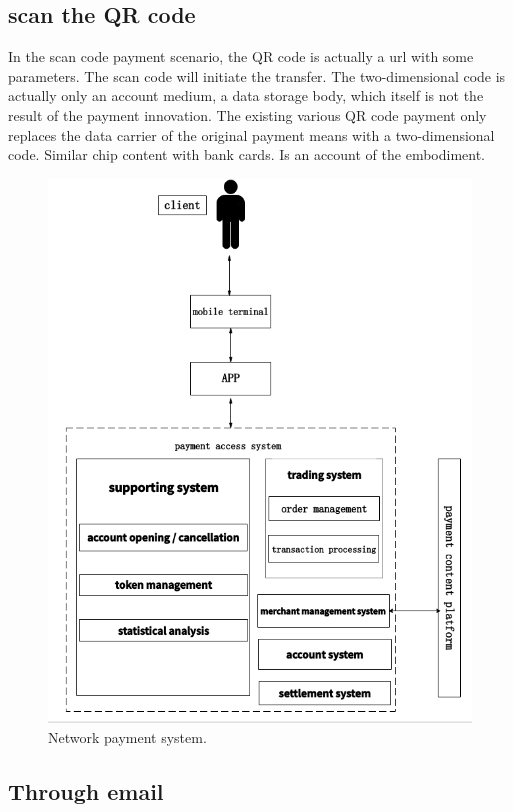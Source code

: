 \documentclass[journal]{IEEEtran}
\begin{document}
\subsection{scan the QR code}
In the scan code payment scenario, the QR code is actually a url with some parameters. The scan code will initiate the transfer. The two-dimensional code is actually only an account medium, a data storage body, which itself is not the result of the payment innovation. The existing various QR code payment only replaces the data carrier of the original payment means with a two-dimensional code. Similar chip content with bank cards. Is an account of the embodiment. 
\begin{figure}[htbp]
\centerline{\includegraphics[scale=0.42]{erweimazhifu.png}}
\caption{Network payment system.}
\label{fig}
\end{figure}

\subsection{Through email}
\end{document}
